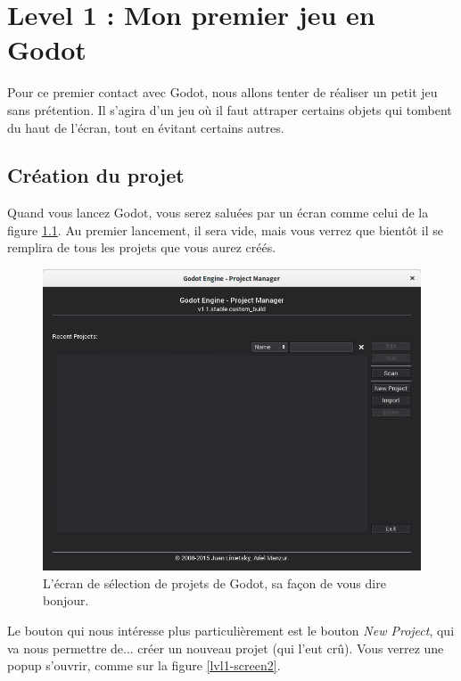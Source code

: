 \chapter{Level 1 : Mon premier jeu en Godot}

Pour ce premier contact avec Godot, nous allons tenter de réaliser un petit jeu sans prétention. Il s'agira d'un jeu où il faut attraper certains objets qui tombent du haut de l'écran, tout en évitant certains autres.

\section{Création du projet}

Quand vous lancez Godot, vous serez saluées par un écran comme celui de la figure \ref{lvl1-screen1}. Au premier lancement, il sera vide, mais vous verrez que bientôt il se remplira de tous les projets que vous aurez créés.

\begin{figure}
  \begin{center}
    \includegraphics[width=12cm]{img/lvl1-screen1.png}
  \end{center}
  \caption{\label{lvl1-screen1} L'écran de sélection de projets de Godot, sa façon de vous dire bonjour.}
\end{figure}

Le bouton qui nous intéresse plus particulièrement est le bouton \emph{New Project}, qui va nous permettre de... créer un nouveau projet (qui l'eut crû). Vous verrez une popup s'ouvrir, comme sur la figure \ref{lvl1-screen2}.

